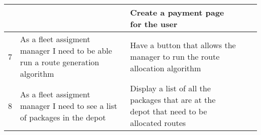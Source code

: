 \documentclass[paper=a4, fontsize=11pt]{scrartcl} %
\numberwithin{equation}{section} %
\numberwithin{figure}{section} %
\numberwithin{table}{section} %
\begin{document}
\begin{table}[]
\begin{tabular}{|p{1cm}|p{4cm}|p{4cm}|p{2cm}|p{2cm}|}
            &                                                                                 & Create a payment page for the user                                                                 &               &                     \\ \hline
7           & As a fleet assigment manager I need to be able run a route generation algorithm & Have a button that allows the manager to run the route allocation algorithm                        &               &                     \\ \hline
8           & As a fleet assigment manager I need to see a list of packages in the depot      & Display a list of all the packages that are at the depot that need to be allocated routes          &               &                     \\ \hline
\end{tabular}
\end{table}
\end{document}
